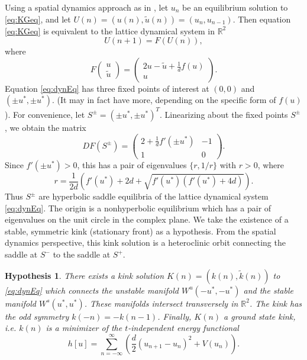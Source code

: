 \documentclass[12pt,reqno]{amsart}
\def\R{{\mathbb R}}
\newtheorem{hypothesis}{Hypothesis}
\begin{document}
Using a spatial dynamics approach as in \cite{Parker2020}, let $u_n$ be an equilibrium solution to \cref{eq:KGeq}, and let $U(n) = (u(n), \tilde{u}(n)) = (u_n, u_{n-1})$. Then equation \cref{eq:KGeq} is equivalent to the lattice dynamical system in $\R^2$
\begin{equation}\label{eq:dynEq}
U(n+1) = F(U(n)),
\end{equation}
where
\[
F\begin{pmatrix}u \\ \tilde{u} \end{pmatrix} =
\begin{pmatrix}2u - \tilde{u} + \frac{1}{d}f(u) \\
u
\end{pmatrix}.
\]
Equation \cref{eq:dynEq} has three fixed points of interest at $(0,0)$ and $(\pm u^*, \pm u^*)$. (It may in fact have more, depending on the specific form of $f(u)$). For convenience, let $S^\pm = (\pm u^*, \pm u^*)^T$. Linearizing about the fixed points $S^\pm$, we obtain the matrix 
\[
D F(S^\pm)=
\begin{pmatrix}2 + \frac{1}{d}f'(\pm u^*) & -1 \\ 1 & 0
\end{pmatrix}.
\]
Since $f'(\pm u^*) > 0$, this has a pair of eigenvalues $\{ r, 1/r \}$ with $r > 0$, where
\begin{equation}\label{eq:r}
r = \frac{1}{2d}\left( f'(u^*) + 2d + \sqrt{f'(u^*)(f'(u^*) + 4d)} \right).
\end{equation}
Thus $S^\pm$ are hyperbolic saddle equilibria of the lattice dynamical system \cref{eq:dynEq}. The origin is a nonhyperbolic equilibrium which has a pair of eigenvalues on the unit circle in the complex plane. We take the existence of a stable, symmetric kink (stationary front) as a hypothesis. From the spatial dynamics perspective, this kink solution is a heteroclinic orbit connecting the saddle at $S^-$ to the saddle at $S^+$.

\begin{hypothesis}\label{hyp:kinkexists}
There exists a kink solution $K(n) = (k(n),\tilde{k}(n))$ to \cref{eq:dynEq} which connects the unstable manifold $W^u(-u^*, -u^*)$ and the stable manifold $W^s(u^*, u^*)$. These manifolds intersect transversely in $\R^2$. 
The kink has the odd symmetry $k(-n) = -k(n-1)$. Finally, $K(n)$ a ground state kink, i.e. $k(n)$ is a minimizer of the $t$-independent energy functional
\begin{equation}
h[u] = \sum_{n=-\infty}^\infty 
\left( \frac{d}{2} (u_{n+1} - u_n)^2 + V(u_n) \right).
\end{equation}
\end{hypothesis}
\end{document}
